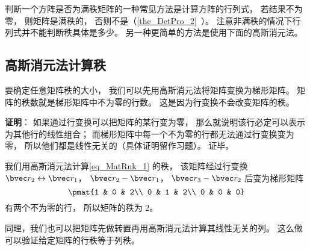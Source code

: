 判断一个方阵是否为满秩矩阵的一种常见方法是计算方阵的行列式， 若结果不为零， 则矩阵是满秩的， 否则不是（\autoref{the_DetPro_2}~）。 注意非满秩的情况下行列式并不能判断秩具体是多少。 另一种更简单的方法是使用下面的高斯消元法。

\subsection{高斯消元法计算秩}
要确定任意矩阵秩的大小， 我们可以先用高斯消元法将矩阵变换为梯形矩阵。 矩阵的秩数就是梯形矩阵中不为零的行数。 这是因为行变换不会改变矩阵的秩。

\textbf{证明}： 如果通过行变换可以把矩阵的某行变为零， 那么就说明该行必定可以表示为其他行的线性组合； 而梯形矩阵中每一个不为零的行都无法通过行变换变为零， 所以他们都是线性无关的（具体证明留作习题）。 证毕。

\begin{example}{}
我们用高斯消元法计算\autoref{eq_MatRnk_1} 的秩， 该矩阵经过行变换 $\bvec r_2 \leftrightarrow \bvec r_1$， $\bvec r_2 - \bvec r_1$， $\bvec r_3 - \bvec r_2$ 后变为梯形矩阵
\begin{equation}
\pmat{1 & 0 & 2\\ 0 & 1 & 2\\ 0 & 0 & 0}
\end{equation}
有两个不为零的行， 所以矩阵的秩为 2。
\end{example}

同理，我们也可以把矩阵先做转置再用高斯消元法计算其线性无关的列。 这么做可以验证给定矩阵的行秩等于列秩。
